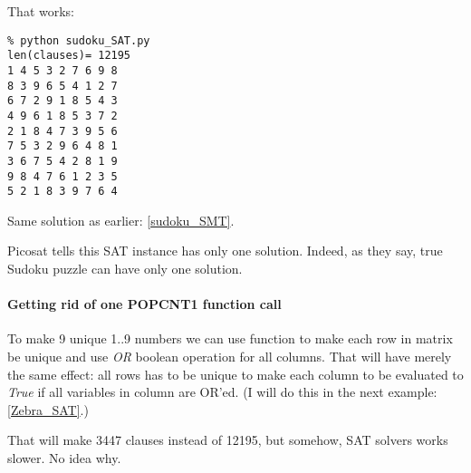 That works:

\begin{lstlisting}
% python sudoku_SAT.py
len(clauses)= 12195
1 4 5 3 2 7 6 9 8
8 3 9 6 5 4 1 2 7
6 7 2 9 1 8 5 4 3
4 9 6 1 8 5 3 7 2
2 1 8 4 7 3 9 5 6
7 5 3 2 9 6 4 8 1
3 6 7 5 4 2 8 1 9
9 8 4 7 6 1 2 3 5
5 2 1 8 3 9 7 6 4
\end{lstlisting}

Same solution as earlier: \ref{sudoku_SMT}.

Picosat tells this SAT instance has only one solution.
Indeed, as they say, true Sudoku puzzle can have only one solution.

\paragraph{Getting rid of one POPCNT1 function call}
\label{OR_in_POPCNT1}

To make 9 unique 1..9 numbers we can use  function to make each row in matrix be unique and
use \textit{OR} boolean operation for all columns.
That will have merely the same effect: all rows has to be unique to make each column to be evaluated
to \textit{True} if all variables in column are OR'ed.
(I will do this in the next example: \ref{Zebra_SAT}.)

That will make 3447 clauses instead of 12195, but somehow, SAT solvers works slower. No idea why.

